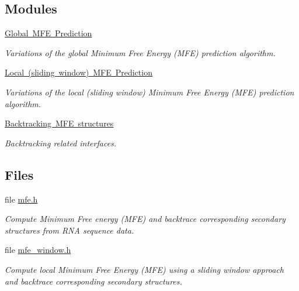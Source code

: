 \subsection*{Modules}
\begin{DoxyCompactItemize}
\item 
\mbox{\hyperlink{group__mfe__global}{Global M\+F\+E Prediction}}
\begin{DoxyCompactList}\small\item\em Variations of the global Minimum Free Energy (M\+FE) prediction algorithm. \end{DoxyCompactList}\item 
\mbox{\hyperlink{group__mfe__window}{Local (sliding window) M\+F\+E Prediction}}
\begin{DoxyCompactList}\small\item\em Variations of the local (sliding window) Minimum Free Energy (M\+FE) prediction algorithm. \end{DoxyCompactList}\item 
\mbox{\hyperlink{group__mfe__backtracking}{Backtracking M\+F\+E structures}}
\begin{DoxyCompactList}\small\item\em Backtracking related interfaces. \end{DoxyCompactList}\end{DoxyCompactItemize}
\subsection*{Files}
\begin{DoxyCompactItemize}
\item 
file \mbox{\hyperlink{mfe_8h}{mfe.\+h}}
\begin{DoxyCompactList}\small\item\em Compute Minimum Free energy (M\+FE) and backtrace corresponding secondary structures from R\+NA sequence data. \end{DoxyCompactList}\item 
file \mbox{\hyperlink{mfe__window_8h}{mfe\+\_\+window.\+h}}
\begin{DoxyCompactList}\small\item\em Compute local Minimum Free Energy (M\+FE) using a sliding window approach and backtrace corresponding secondary structures. \end{DoxyCompactList}\end{DoxyCompactItemize}
